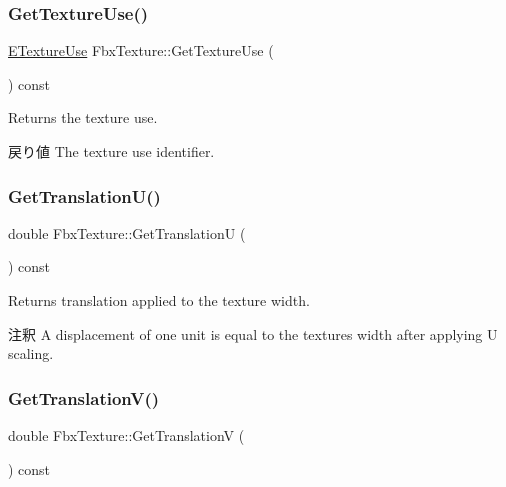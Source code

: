 \mbox{\label{class_fbx_texture_aada6ca015322195cddfa90ccb5274e31}} 
\subsubsection{\texorpdfstring{Get\+Texture\+Use()}{GetTextureUse()}}
{\footnotesize\ttfamily \hyperlink{class_fbx_texture_af034d10e711237dd9ae92a5965787f25}{E\+Texture\+Use} Fbx\+Texture\+::\+Get\+Texture\+Use (\begin{DoxyParamCaption}{ }\end{DoxyParamCaption}) const}

Returns the texture use. \begin{DoxyReturn}{戻り値}
The texture use identifier. 
\end{DoxyReturn}
\mbox{\label{class_fbx_texture_a7785949815ca2cdaa44af41f00c4a3bc}} 
\subsubsection{\texorpdfstring{Get\+Translation\+U()}{GetTranslationU()}}
{\footnotesize\ttfamily double Fbx\+Texture\+::\+Get\+TranslationU (\begin{DoxyParamCaption}{ }\end{DoxyParamCaption}) const}

Returns translation applied to the texture width. \begin{DoxyRemark}{注釈}
A displacement of one unit is equal to the texture\textquotesingle{}s width after applying U scaling. 
\end{DoxyRemark}
\mbox{\label{class_fbx_texture_a96e08939c1efcc3edbc7392a86fb6c43}} 
\subsubsection{\texorpdfstring{Get\+Translation\+V()}{GetTranslationV()}}
{\footnotesize\ttfamily double Fbx\+Texture\+::\+Get\+TranslationV (\begin{DoxyParamCaption}{ }\end{DoxyParamCaption}) const}

